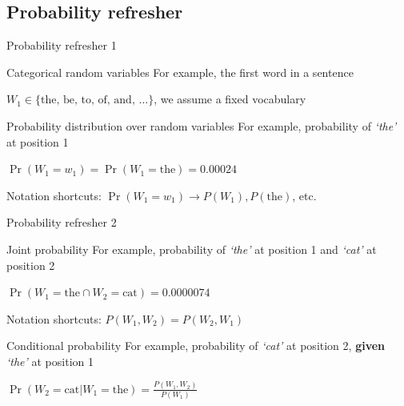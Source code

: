 \documentclass[12pt,aspectratio=169,handout]{beamer}
\begin{document}
\subsection{Probability refresher}


\begin{frame}{Probability refresher 1}
	
	\begin{block}{Categorical random variables}
		For example, the first word in a sentence
		
		$W_1 \in \{ \textrm{the, be, to, of, and, } \ldots \}$, we assume a fixed vocabulary
	\end{block}
	
	\pause
	
	\begin{block}{Probability distribution over random variables}
		For example, probability of \emph{`the'} at position 1
		
		$\Pr(W_1 = w_1) = \Pr(W_1 = \text{the}) = 0.00024$
		
		\pause
		
		Notation shortcuts: $\Pr(W_1 = w_1) \to P(W_1), P(\text{the})$, etc.
	\end{block}
	
\end{frame}


\begin{frame}{Probability refresher 2}
	
	
	\begin{block}{Joint probability}
		For example, probability of \emph{`the'} at position 1 and \emph{`cat'} at position 2
		
		$\Pr(W_1 = \text{the} \cap W_2 = \text{cat}) = 0.0000074$
		
		\pause
		
		Notation shortcuts: $P(W_1, W_2) = P(W_2, W_1)$
	\end{block}
	
	\pause
	
	\begin{block}{Conditional probability}
		For example, probability of \emph{`cat'} at position 2, \textbf{given} \emph{`the'} at position 1
		
		$\Pr(W_2 = \text{cat} | W_1 = \text{the} ) = \frac{P(W_1, W_2)}{P(W_1)}$
	\end{block}
	
\end{frame}
\end{document}
